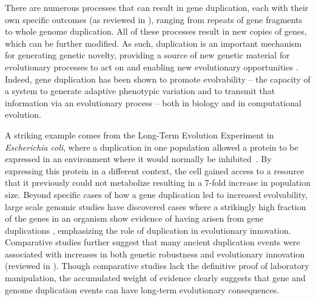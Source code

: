 There are numerous processes that can result in gene duplication, each with their own specific outcomes (as reviewed in \citep{Zhang:2003fw}), ranging from repeats of gene fragments to whole genome duplication. All of these processes result in %
new copies of genes, which can be further modified.
As such, duplication is an important mechanism for generating genetic novelty, providing a source of new genetic material for evolutionary processes to act on and enabling new evolutionary opportunities \citep{Zhang:2003fw,Crow:2006role,Magadum:2013wu}. Indeed, gene duplication has been shown to promote evolvability -- the capacity of a system to generate adaptive phenotypic variation %
and to transmit that information via an evolutionary process \citep{Hu:2010ea} -- both in biology and in computational evolution.  %

A striking example comes from the Long-Term Evolution Experiment in \textit{Escherichia coli}, where a duplication in one population allowed a protein to be expressed in an environment where it would normally be inhibited~\citep{blount_genomic_2012}.  By expressing this protein in a different context, the cell gained access to a resource that it previously could not metabolize resulting in a 7-fold increase in population size. %
Beyond specific cases of how a gene duplication led to increased evolvability, large scale genomic studies have discovered cases where a strikingly high fraction of the genes in an organism show evidence of having arisen from gene duplications \citep{teichmann_structural_1998,Teichmann:2004cz}, emphasizing the role of duplication in evolutionary innovation.  Comparative studies further suggest that many ancient duplication events were associated with increases in both genetic robustness and evolutionary innovation (reviewed in \citep{wagner_gene_2008}).  Though comparative studies lack the definitive proof of laboratory manipulation, the accumulated weight of evidence clearly suggests that gene and genome duplication events can have long-term evolutionary consequences.

